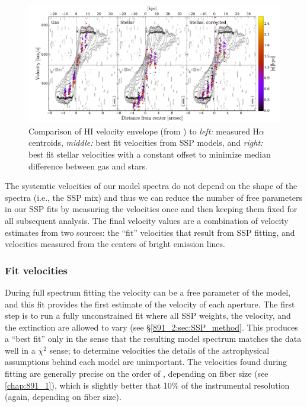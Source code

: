 \begin{figure}[t]
  \centering
  \includegraphics[width=\textwidth]{891_2/figs/Swat_vel.pdf}
  \caption[Comparison of measure stellar and gas velocities to HI
    velocity data]{\fixspacing\label{891_2:fig:Swat_vel}Comparison of
    HI velocity envelope (from \citet{Swaters97}) to \emph{left:}
    measured H$\alpha$ centroids, \emph{middle:} best fit velocities
    from SSP models, and \emph{right:} best fit stellar velocities
    with a constant offset to minimize median difference between gas
    and stars.}
\end{figure}
The systemtic velocities of our model spectra do not depend on the
shape of the spectra (i.e., the SSP mix) and thus we can reduce the
number of free parameters in our SSP fits by measuring the velocities
once and then keeping them fixed for all subsequent analysis. The
final velocity values are a combination of velocity estimates from two
sources: the ``fit'' velocities that result from SSP fitting, and
velocities measured from the centers of bright emission lines.


\subsubsection{Fit velocities}
During full spectrum fitting the velocity can be a free parameter of
the model, and this fit provides the first estimate of the velocity of
each aperture. The first step is to run a fully unconstrained fit
where all SSP weights, the velocity, and the extinction are allowed to
vary (see \S\ref{891_2:sec:SSP_method}. This produces a ``best fit'' only in
the sense that the resulting model spectrum matches the data well in a
$\chi^2$ sense; to determine velocities the details of the
astrophysical assumptions behind each model are unimportant. The
velocities found during fitting are generally precise on the order of
, depending on \GP fiber size (see
\ref{chap:891_1}), which is slightly better that 10\% of the
instrumental resolution (again, depending on fiber size).

